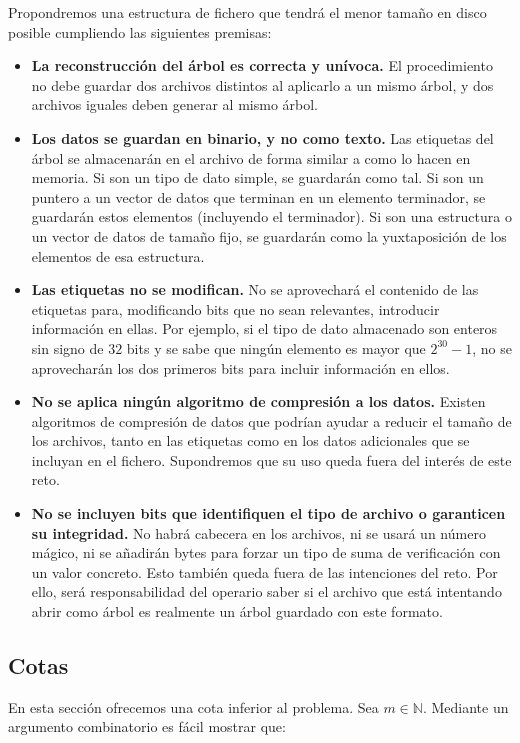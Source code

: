 \documentclass{article}
\begin{document}
Propondremos una estructura de fichero que tendrá el menor tamaño en disco
posible cumpliendo las siguientes premisas:
\begin{itemize}
	\item \textbf{La reconstrucción del árbol es correcta y unívoca.}
  El procedimiento no debe guardar dos archivos distintos al aplicarlo a un mismo
  árbol, y dos archivos iguales deben generar al mismo árbol.
	\item \textbf{Los datos se guardan en binario, y no como texto.} Las etiquetas
  del árbol se almacenarán en el archivo de forma similar a como lo hacen en
  memoria. Si son un tipo de dato simple, se guardarán como tal. Si son un puntero
  a un vector de datos que terminan en un elemento terminador, se guardarán
  estos elementos (incluyendo el terminador). Si son una estructura o un vector
  de datos de tamaño fijo, se guardarán como la yuxtaposición de los elementos
  de esa estructura.
	\item \textbf{Las etiquetas no se modifican.} No se aprovechará el contenido
  de las etiquetas para, modificando bits que no sean relevantes, introducir
  información en ellas. Por ejemplo, si el tipo de dato almacenado son enteros
  sin signo de $32$ bits y se sabe que ningún elemento es mayor que $2^{30}-1$,
  no se aprovecharán los dos primeros bits para incluir información en ellos.
	\item \textbf{No se aplica ningún algoritmo de compresión a los datos.}
  Existen algoritmos de compresión de datos que podrían ayudar a reducir el
  tamaño de los archivos, tanto en las etiquetas como en los datos adicionales
  que se incluyan en el fichero. Supondremos que su uso queda fuera del interés
  de este reto.
	\item \textbf{No se incluyen bits que identifiquen el tipo de archivo
  o garanticen su integridad.} No habrá cabecera en los archivos, ni se usará un
  número mágico, ni se añadirán bytes para forzar un tipo de suma de verificación
  con un valor concreto. Esto también queda fuera de las intenciones del reto.
  Por ello, será responsabilidad del operario saber si el archivo que está
  intentando abrir como árbol es realmente un árbol guardado con este formato.
\end{itemize}

\subsection{Cotas}

En esta sección ofrecemos una cota inferior al problema. Sea $m \in \mathbb{N}$.
Mediante un argumento combinatorio es fácil mostrar que:
\end{document}
